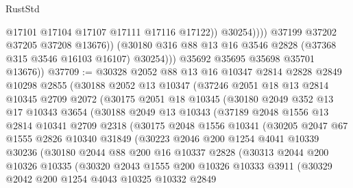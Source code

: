 \begin{lexlean}{RustStd}
\begin{coremodule}
                            @17101
                            @17104
                            @17107
                            @17111
                            @17116
                            @17122))
                        @30254))))
                @37199
                @37202
                @37205
                @37208
                @13676))
            (@30180 @316 @88 @13 @16 @3546 @2828 (@37368 @315 @3546 @16103 @16107) @30254)))
        @35692
        @35695
        @35698
        @35701
        @13676))
@37709 := @30328
    @2052
    @88
    @13
    @16
    @10347
    @2814
    @2828
    @2849
    @10298
    @2855
    (@30188
      @2052
      @13
      @10347
      (@37246
        @2051
        @18
        @13
        @2814
        @10345
        @2709
        @2072
        (@30175
          @2051
          @18
          @10345
          (@30180
            @2049
            @352
            @13
            @17
            @10343
            @3654
            (@30188
              @2049
              @13
              @10343
              (@37189
                @2048
                @1556
                @13
                @2814
                @10341
                @2709
                @2318
                (@30175
                  @2048
                  @1556
                  @10341
                  (@30205
                    @2047
                    @67
                    @1555
                    @2826
                    @10340
                    @31849
                    (@30223
                      @2046
                      @200
                      @1254
                      @4041
                      @10339
                      @30236
                      (@30180
                        @2044
                        @88
                        @200
                        @16
                        @10337
                        @2828
                        (@30313
                          @2044
                          @200
                          @10326
                          @10335
                          (@30320
                            @2043
                            @1555
                            @200
                            @10326
                            @10333
                            @3911
                            (@30329
                              @2042
                              @200
                              @1254
                              @4043
                              @10325
                              @10332
                              @2849

\end{coremodule}
\end{lexlean}
